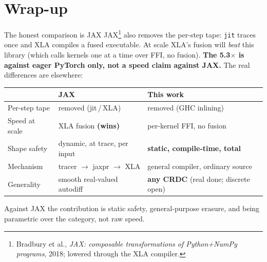 \documentclass[aspectratio=169,11pt]{beamer}
\begin{document}
\section{Wrap-up}

\begin{frame}{The honest comparison is JAX}
  \small JAX\footnote[frame]{Bradbury et al., \emph{JAX: composable transformations of Python+NumPy programs}, 2018; lowered through the XLA compiler.} also removes the per-step tape: \texttt{jit} traces once and XLA compiles a fused
  executable. At scale XLA's fusion will \emph{beat} this library (which calls kernels one at a time
  over FFI, no fusion). \textbf{The 5.3$\times$ is against eager PyTorch only, not a speed claim
  against JAX.} The real differences are elsewhere:
  \vspace{0.4em}
  \begin{center}\footnotesize
  \begin{tabular}{@{}lll@{}}
    \toprule
                   & \textbf{JAX} & \textbf{This work} \\
    \midrule
    Per-step tape  & removed (jit\,/\,XLA)        & removed (GHC inlining) \\
    Speed at scale & XLA fusion \textbf{(wins)}   & per-kernel FFI, no fusion \\
    Shape safety   & dynamic, at trace, per input & \textbf{static, compile-time, total} \\
    Mechanism      & tracer $\to$ jaxpr $\to$ XLA & general compiler, ordinary source \\
    Generality     & smooth real-valued autodiff  & \textbf{any CRDC} (real done; discrete open) \\
    \bottomrule
  \end{tabular}
  \end{center}
  \centering\footnotesize Against JAX the contribution is static safety, general-purpose erasure, and
  being parametric over the category, not raw speed.
\end{frame}
\end{document}
